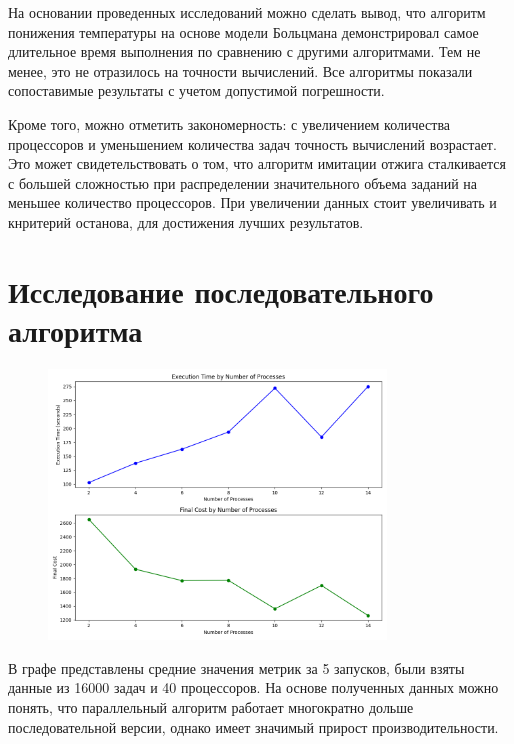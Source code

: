 \documentclass[openany, twoside, a4paper, 12pt]{extbook}
\begin{document}
На основании проведенных исследований можно сделать вывод, что алгоритм понижения температуры на основе модели Больцмана 
демонстрировал самое длительное время выполнения по сравнению с другими алгоритмами. Тем не менее, это не отразилось на 
точности вычислений. Все алгоритмы показали сопоставимые результаты с учетом допустимой погрешности.

Кроме того, можно отметить закономерность: с увеличением количества процессоров и уменьшением количества задач точность 
вычислений возрастает. Это может свидетельствовать о том, что алгоритм имитации отжига сталкивается с большей сложностью 
при распределении значительного объема заданий на меньшее количество процессоров. При увеличении данных стоит увеличивать
и кнритерий останова, для достижения лучших результатов.
\section*{Исследование последовательного алгоритма}
\begin{figure}[h]
    \centering
    \includegraphics[width=0.8\textwidth]{metrics_plot.png}
    \label{fig:image7}
\end{figure}
В графе представлены средние значения метрик за 5 запусков, были взяты данные из 16000 задач и 40 процессоров. На основе полученных данных можно понять, 
что параллельный алгоритм работает многократно дольше последовательной версии, однако имеет значимый прирост производительности.
\end{document}
